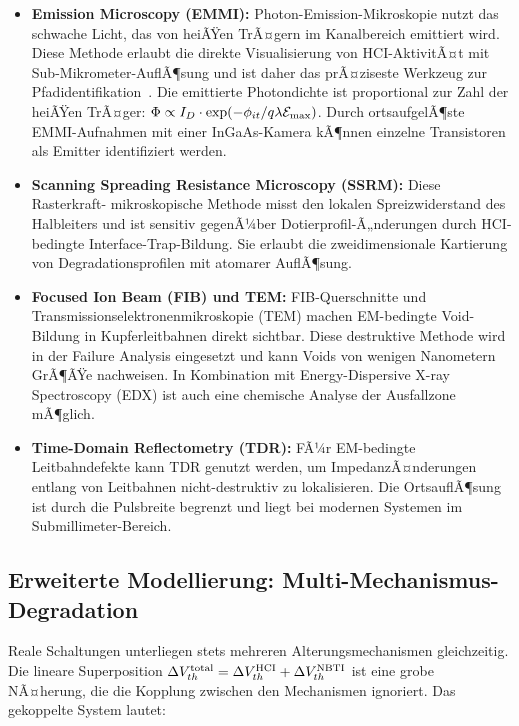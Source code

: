 ﻿\documentclass[a4paper,12pt]{article}
\theoremstyle{definition}
\begin{document}
\begin{itemize}
	\item \textbf{Emission Microscopy (EMMI):} Photon-Emission-Mikroskopie nutzt das
	      schwache Licht, das von heiÃŸen TrÃ¤gern im Kanalbereich emittiert wird.
	      Diese Methode erlaubt die direkte Visualisierung von HCI-AktivitÃ¤t mit
	      Sub-Mikrometer-AuflÃ¶sung und ist daher das prÃ¤ziseste Werkzeug zur
	      Pfadidentifikation~\cite{nikawa1992}. Die emittierte Photondichte ist
	      proportional zur Zahl der heiÃŸen TrÃ¤ger:
	      $\Phi \propto I_D \cdot \exp(-\phi_{it} / q\lambda \mathcal{E}_{\rm max})$.
	      Durch ortsaufgelÃ¶ste EMMI-Aufnahmen mit einer InGaAs-Kamera kÃ¶nnen
	      einzelne Transistoren als Emitter identifiziert werden.
	\item \textbf{Scanning Spreading Resistance Microscopy (SSRM):} Diese Rasterkraft-
	      mikroskopische Methode misst den lokalen Spreizwiderstand des Halbleiters
	      und ist sensitiv gegenÃ¼ber Dotierprofil-Ã„nderungen durch HCI-bedingte
	      Interface-Trap-Bildung. Sie erlaubt die zweidimensionale Kartierung von
	      Degradationsprofilen mit atomarer AuflÃ¶sung.
	\item \textbf{Focused Ion Beam (FIB) und TEM:} FIB-Querschnitte und
	      Transmissionselektronenmikroskopie (TEM) machen EM-bedingte Void-Bildung
	      in Kupferleitbahnen direkt sichtbar. Diese destruktive Methode wird in der
	      Failure Analysis eingesetzt und kann Voids von wenigen Nanometern GrÃ¶ÃŸe
	      nachweisen. In Kombination mit Energy-Dispersive X-ray Spectroscopy (EDX)
	      ist auch eine chemische Analyse der Ausfallzone mÃ¶glich.
	\item \textbf{Time-Domain Reflectometry (TDR):} FÃ¼r EM-bedingte Leitbahndefekte
	      kann TDR genutzt werden, um ImpedanzÃ¤nderungen entlang von Leitbahnen
	      nicht-destruktiv zu lokalisieren. Die OrtsauflÃ¶sung ist durch die
	      Pulsbreite begrenzt und liegt bei modernen Systemen im Submillimeter-Bereich.
\end{itemize}

\subsection{Erweiterte Modellierung: Multi-Mechanismus-Degradation}
\label{sub:multi}

Reale Schaltungen unterliegen stets mehreren Alterungsmechanismen gleichzeitig.
Die lineare Superposition $\Delta V_{th}^{\rm total} = \Delta V_{th}^{\rm HCI}
+ \Delta V_{th}^{\rm NBTI}$ ist eine grobe NÃ¤herung, die die Kopplung zwischen
den Mechanismen ignoriert. Das gekoppelte System lautet:
\end{document}
